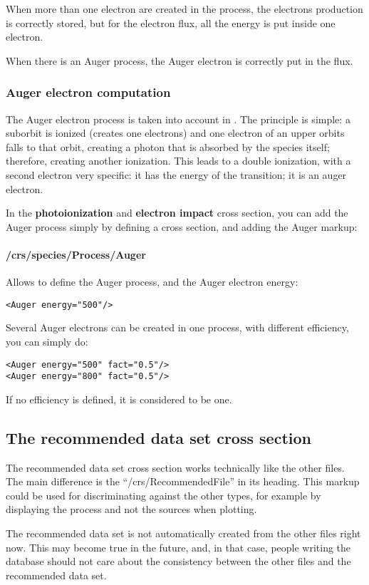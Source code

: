 When more than one electron are created in the process, the electrons production is correctly stored, but for the electron flux, all the energy is put inside one electron.

When there is an Auger process, the Auger electron is correctly put in the flux.

\subsubsection{Auger electron computation}

The Auger electron process is taken into account in \Prog. The principle is simple: a suborbit is ionized (creates one electrons) and one electron of an upper orbits falls to that orbit, creating a photon that is absorbed by the species itself; therefore, creating another ionization.
This leads to a double ionization, with a second electron very specific: it has the energy of the transition; it is an auger electron.

In the \textbf{photoionization} and \textbf{electron impact} cross section, you can add the Auger process simply by defining a cross section, and adding the Auger markup:

\paragraph{/crs/species/Process/Auger}
Allows to define the Auger process, and the Auger electron energy:
\begin{verbatim}
<Auger energy="500"/>
\end{verbatim}


Several Auger electrons can be created in one process, with different efficiency, you can simply do:

\begin{verbatim}
<Auger energy="500" fact="0.5"/>
<Auger energy="800" fact="0.5"/>
\end{verbatim}

If no efficiency is defined, it is considered to be one.


\subsection{The recommended data set cross section}

The recommended data set cross section works technically like the other files.
The main difference is the ``/crs/RecommendedFile'' in its heading.
This markup could be used for discriminating against the other types, for example by displaying the process and 
not the sources when plotting. 

The recommended data set is not automatically created from the other files right now. This may become true in the future, and, in that case, people writing the database should not care about the consistency between the other files and the recommended data set.










